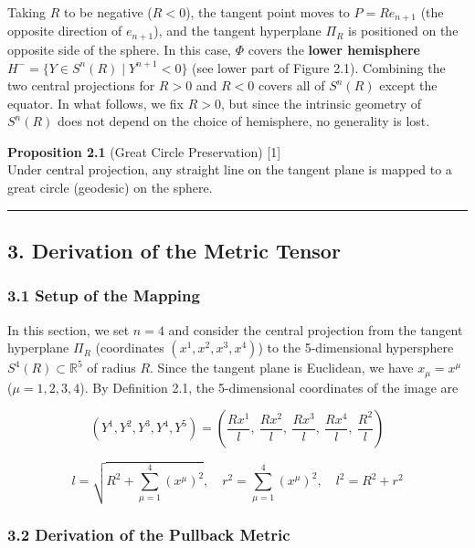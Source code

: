 \documentclass[a4paper,11pt]{article}
\theoremstyle{definition}
\begin{document}
Taking \(R\) to be negative (\(R < 0\)), the tangent point moves to \(P = Re_{n+1}\) (the opposite direction of \(e_{n+1}\)), and the tangent hyperplane \(\Pi_R\) is positioned on the opposite side of the sphere. In this case, \(\Phi\) covers the \textbf{lower hemisphere} \(H^- = \{Y \in S^n(R) \mid Y^{n+1} < 0\}\) (see lower part of Figure 2.1). Combining the two central projections for \(R > 0\) and \(R < 0\) covers all of \(S^n(R)\) except the equator. In what follows, we fix \(R > 0\), but since the intrinsic geometry of \(S^n(R)\) does not depend on the choice of hemisphere, no generality is lost.

\textbf{Proposition 2.1} (Great Circle Preservation) {[}1{]}\\
Under central projection, any straight line on the tangent plane is mapped to a great circle (geodesic) on the sphere.

\begin{center}\rule{0.5\linewidth}{0.5pt}\end{center}

\subsection{3. Derivation of the Metric Tensor}\label{derivation-of-the-metric-tensor}

\subsubsection{3.1 Setup of the Mapping}\label{setup-of-the-mapping}

In this section, we set \(n=4\) and consider the central projection from the tangent hyperplane \(\Pi_R\) (coordinates \((x^1, x^2, x^3, x^4)\)) to the 5-dimensional hypersphere \(S^4(R) \subset \mathbb{R}^5\) of radius \(R\). Since the tangent plane is Euclidean, we have \(x_\mu = x^\mu\) (\(\mu = 1,2,3,4\)). By Definition 2.1, the 5-dimensional coordinates of the image are

\[(Y^1, Y^2, Y^3, Y^4, Y^5) = \left(\frac{Rx^1}{l},\ \frac{Rx^2}{l},\ \frac{Rx^3}{l},\ \frac{Rx^4}{l},\ \frac{R^2}{l}\right) \tag{3.1}\]

\[l = \sqrt{R^2 + \sum_{\mu=1}^4 (x^\mu)^2},\quad r^2 = \sum_{\mu=1}^4(x^\mu)^2,\quad l^2 = R^2 + r^2 \tag{3.2}\]

\subsubsection{3.2 Derivation of the Pullback Metric}\label{derivation-of-the-pullback-metric}
\end{document}
